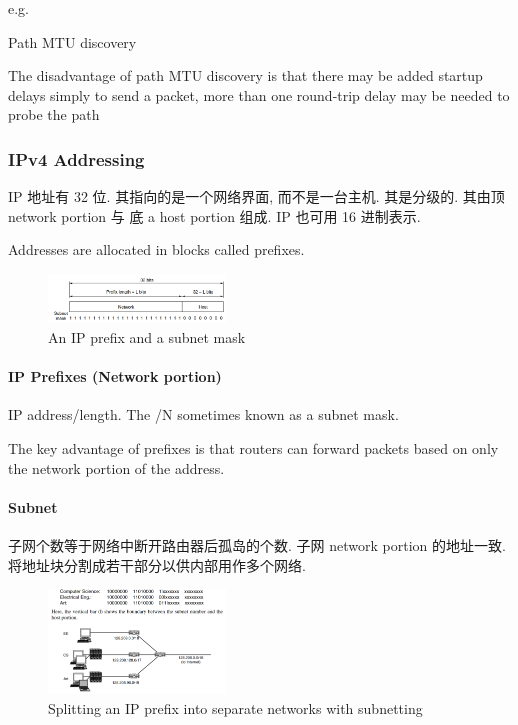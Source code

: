 e.g. %

Path MTU discovery

The disadvantage of path MTU discovery is that there may be added startup delays simply to send a packet, more than one round-trip delay may be needed to probe the path

\subsubsection{IPv4 Addressing}
IP 地址有 32 位. 其指向的是一个网络界面, 而不是一台主机. 其是分级的. 其由顶 network portion 与 底 a host portion 组成. IP 也可用 16 进制表示.


Addresses are allocated in blocks called prefixes.
\begin{figure}[!htb]
    \centering
    \includegraphics[width=0.42\textwidth]{pic/CN5/An IP prefix and a subnet mask}
    \caption{An IP prefix and a subnet mask}
\end{figure}

\paragraph{IP Prefixes (Network portion)}IP address/length. The /N sometimes known as a subnet mask. 

The key advantage of prefixes is that routers can forward
packets based on only the network portion of the address. 

\paragraph{Subnet}子网个数等于网络中断开路由器后孤岛的个数. 子网 network portion 的地址一致. 将地址块分割成若干部分以供内部用作多个网络. 

\begin{figure}[!htb]
    \centering
    \includegraphics[width=0.42\textwidth]{pic/CN5/Splitting an IP prefix into separate networks with subnetting}
    \caption{Splitting an IP prefix into separate networks with subnetting}
\end{figure}

